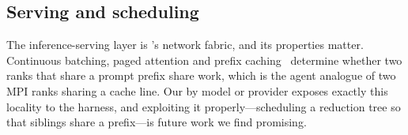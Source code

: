 \subsection{Serving and scheduling}

The inference-serving layer is \ampi{}'s network fabric, and its properties
matter. Continuous batching, paged attention and prefix
caching~\cite{yu2022orca,kwon2023vllm,zheng2024sglang} determine whether two
ranks that share a prompt prefix share work, which is the agent analogue of
two MPI ranks sharing a cache line. Our  by model or
provider exposes exactly this locality to the harness, and exploiting it
properly---scheduling a reduction tree so that siblings share a
prefix---is future work we find promising.
